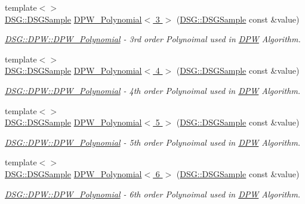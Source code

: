 \begin{DoxyCompactItemize}
{\footnotesize template$<$$>$ }\\\hyperlink{namespace_d_s_g_ac39a94cd27ebcd9c1e7502d0c624894a}{D\+S\+G\+::\+D\+S\+G\+Sample} \hyperlink{namespace_d_s_g_1_1_d_p_w_a6f20dd7808a5e5bf3df682ce92eeb520}{D\+P\+W\+\_\+\+Polynomial$<$ 3 $>$} (\hyperlink{namespace_d_s_g_ac39a94cd27ebcd9c1e7502d0c624894a}{D\+S\+G\+::\+D\+S\+G\+Sample} const \&value)
\begin{DoxyCompactList}\small\item\em \hyperlink{namespace_d_s_g_1_1_d_p_w_a1677c6fedac376f3e9b284bc9a4a227c}{D\+S\+G\+::\+D\+P\+W\+::\+D\+P\+W\+\_\+\+Polynomial} -\/ 3rd order Polynoimal used in \hyperlink{namespace_d_s_g_1_1_d_p_w}{D\+P\+W} Algorithm. \end{DoxyCompactList}\item 
{\footnotesize template$<$$>$ }\\\hyperlink{namespace_d_s_g_ac39a94cd27ebcd9c1e7502d0c624894a}{D\+S\+G\+::\+D\+S\+G\+Sample} \hyperlink{namespace_d_s_g_1_1_d_p_w_a56e019e6b80abdc8d0d9d63e69b65da0}{D\+P\+W\+\_\+\+Polynomial$<$ 4 $>$} (\hyperlink{namespace_d_s_g_ac39a94cd27ebcd9c1e7502d0c624894a}{D\+S\+G\+::\+D\+S\+G\+Sample} const \&value)
\begin{DoxyCompactList}\small\item\em \hyperlink{namespace_d_s_g_1_1_d_p_w_a1677c6fedac376f3e9b284bc9a4a227c}{D\+S\+G\+::\+D\+P\+W\+::\+D\+P\+W\+\_\+\+Polynomial} -\/ 4th order Polynoimal used in \hyperlink{namespace_d_s_g_1_1_d_p_w}{D\+P\+W} Algorithm. \end{DoxyCompactList}\item 
{\footnotesize template$<$$>$ }\\\hyperlink{namespace_d_s_g_ac39a94cd27ebcd9c1e7502d0c624894a}{D\+S\+G\+::\+D\+S\+G\+Sample} \hyperlink{namespace_d_s_g_1_1_d_p_w_a1b04cfea475babd2006c84ba118c1909}{D\+P\+W\+\_\+\+Polynomial$<$ 5 $>$} (\hyperlink{namespace_d_s_g_ac39a94cd27ebcd9c1e7502d0c624894a}{D\+S\+G\+::\+D\+S\+G\+Sample} const \&value)
\begin{DoxyCompactList}\small\item\em \hyperlink{namespace_d_s_g_1_1_d_p_w_a1677c6fedac376f3e9b284bc9a4a227c}{D\+S\+G\+::\+D\+P\+W\+::\+D\+P\+W\+\_\+\+Polynomial} -\/ 5th order Polynoimal used in \hyperlink{namespace_d_s_g_1_1_d_p_w}{D\+P\+W} Algorithm. \end{DoxyCompactList}\item 
{\footnotesize template$<$$>$ }\\\hyperlink{namespace_d_s_g_ac39a94cd27ebcd9c1e7502d0c624894a}{D\+S\+G\+::\+D\+S\+G\+Sample} \hyperlink{namespace_d_s_g_1_1_d_p_w_a0c0f87dd5176cd98f69c5ec46db50369}{D\+P\+W\+\_\+\+Polynomial$<$ 6 $>$} (\hyperlink{namespace_d_s_g_ac39a94cd27ebcd9c1e7502d0c624894a}{D\+S\+G\+::\+D\+S\+G\+Sample} const \&value)
\begin{DoxyCompactList}\small\item\em \hyperlink{namespace_d_s_g_1_1_d_p_w_a1677c6fedac376f3e9b284bc9a4a227c}{D\+S\+G\+::\+D\+P\+W\+::\+D\+P\+W\+\_\+\+Polynomial} -\/ 6th order Polynoimal used in \hyperlink{namespace_d_s_g_1_1_d_p_w}{D\+P\+W} Algorithm. \end{DoxyCompactList}\end{DoxyCompactItemize}


